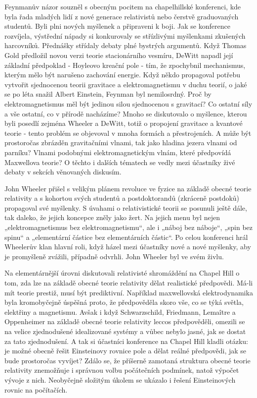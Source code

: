   Feynmanův názor souzněl s obecným pocitem na chapelhillské konferenci, kde byla řada mladých lidí
  z nové generace relativistů nebo čerstvě graduovaných studentů. Byli plni nových myšlenek a
  připraveni k boji. Jak se konference rozvíjela, výstřední nápady si konkurovaly se střízlivými
  myšlenkami zkušených harcovníků. Přednášky střídaly debaty plné bystrých argumentů. Když Thomas
  Gold předložil novou verzi teorie stacionárního vesmíru, DeWitt napadl její základní předpoklad -
  Hoyleovo kreační pole - tím, že zpochybnil mechanismus, kterým mělo být narušeno zachování
  energie. Když někdo propagoval potřebu vytvořit sjednocenou teorii gravitace a elektromagnetismu v
  duchu teorií, o jaké se po léta snažil Albert Einstein, Feynman byl nemilosrdný. Proč by
  elektromagnetismus měl být jedinou silou sjednocenou s gravitací? Co ostatní síly a vše ostatní,
  co v přírodě nacházíme? Mnoho se diskutovalo o myšlence, kterou byli posedlí zejména Wheeler a
  DeWitt, totiž o propojení gravitace a kvantové teorie - tento problém se objevoval v mnoha formách
  a přestrojeních. A může být prostoročas zbrázděn gravitačními vlnami, tak jako hladina jezera
  vlnami od parníku? Vlnami podobnými elektromagnetickým vlnám, které předpovídá Maxwellova teorie?
  O těchto i dalších tématech se vedly mezi účastníky živé debaty v sekcích věnovaných diskusím. 

  John Wheeler přišel s velikým plánem revoluce ve fyzice na základě obecné teorie relativity a s
  kohortou svých studentů a postdoktorandů (zkráceně postdoků) propagoval své myšlenky. S úvahami o
  relativistické teorii se posunuli ještě dále, tak daleko, že jejich koncepce zněly jako žert. Na
  jejich menu byl nejen „elektromagnetismus bez elektromagnetismu“, ale i „náboj bez náboje“, „spin
  bez spinu“ a „elementární částice bez elementárních částic“. Po celou konferenci hrál Wheelerův
  klan hlavní roli, když házel mezi účastníky nové a nové myšlenky, aby je promyšleně zvážili,
  případně odvrhli. John Wheeler byl ve svém živlu. 

  Na elementárnější úrovni diskutovali relativisté shromáždění na Chapel Hill o tom, zda lze na
  základě obecné teorie relativity dělat realistické předpovědi. Má-li mít teorie prestiž, musí být
  prediktivní. Například maxwellovská elektrodynamika byla kromobyčejně úspěšná proto, že
  předpověděla skoro vše, co se týká světla, elektřiny a magnetismu. Avšak i když Schwarzschild,
  Friedmann, Lemaître a Oppenheimer na základě obecné teorie relativity leccos předpověděli, omezili
  se na velice zjednodušené idealizované systémy a vůbec nebylo jasné, jak se dostat za tato
  zjednodušení. A tak si účastníci konference na Chapel Hill kladli otázku: je možné obecně řešit
  Einsteinovy rovnice pole a dělat reálné předpovědi, jak se bude prostoročas vyvíjet? Zdálo se, že
  příšerně zamotaná struktura obecné teorie relativity znemožňuje i správnou volbu počátečních
  podmínek, natož výpočet vývoje z nich. Neobyčejně složitým úkolem se ukázalo i řešení
  Einsteinových rovnic na počítačích. 

